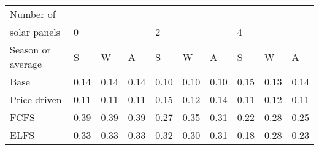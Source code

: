 \begin{table}[h] 
\centering 
\begin{tabular}{l|lll|lll|lll}Number of \\ solar panels&0& & &2& & &4& & \\ \hline 
Season or average & S & W & A & S & W & A & S & W & A \\ \hline 
Base&0.14&0.14&0.14&0.10&0.10&0.10&0.15&0.13&0.14 \\ 
Price driven&0.11&0.11&0.11&0.15&0.12&0.14&0.11&0.12&0.11 \\ 
FCFS&0.39&0.39&0.39&0.27&0.35&0.31&0.22&0.28&0.25 \\ 
ELFS&0.33&0.33&0.33&0.32&0.30&0.31&0.18&0.28&0.23 \\ 
\end{tabular} 
\end{table}